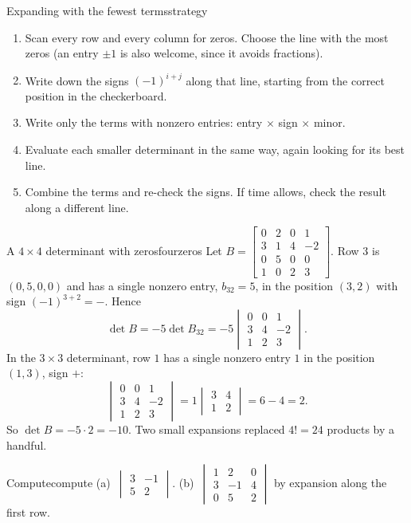 \documentclass[11pt]{article}
\begin{document}
\begin{proc}{Expanding with the fewest terms}{strategy}
\begin{enumerate}
  \item Scan every row and every column for zeros. Choose the line with the most zeros (an entry $\pm1$ is also welcome, since it avoids fractions).
  \item Write down the signs $(-1)^{i+j}$ along that line, starting from the correct position in the checkerboard.
  \item Write only the terms with nonzero entries: entry $\times$ sign $\times$ minor.
  \item Evaluate each smaller determinant in the same way, again looking for its best line.
  \item Combine the terms and re-check the signs. If time allows, check the result along a different line.
\end{enumerate}
\end{proc}

\begin{exmp}{A $4\times4$ determinant with zeros}{fourzeros}
Let $B=\begin{bmatrix}0&2&0&1\\3&1&4&-2\\0&5&0&0\\1&0&2&3\end{bmatrix}$. Row $3$ is $(0,5,0,0)$ and has a single nonzero entry, $b_{32}=5$, in the position $(3,2)$ with sign $(-1)^{3+2}=-$. Hence
\[
\det B=-5\det B_{32}=-5\begin{vmatrix}0&0&1\\3&4&-2\\1&2&3\end{vmatrix}.
\]
In the $3\times3$ determinant, row $1$ has a single nonzero entry $1$ in the position $(1,3)$, sign $+$:
\[
\begin{vmatrix}0&0&1\\3&4&-2\\1&2&3\end{vmatrix}=1\begin{vmatrix}3&4\\1&2\end{vmatrix}=6-4=2.
\]
So $\det B=-5\cdot2=-10$. Two small expansions replaced $4!=24$ products by a handful.
\end{exmp}

\begin{kc}{Compute}{compute}
(a)~$\begin{vmatrix}3&-1\\5&2\end{vmatrix}$. \quad (b)~$\begin{vmatrix}1&2&0\\3&-1&4\\0&5&2\end{vmatrix}$ by expansion along the first row.
\end{kc}
\end{document}
